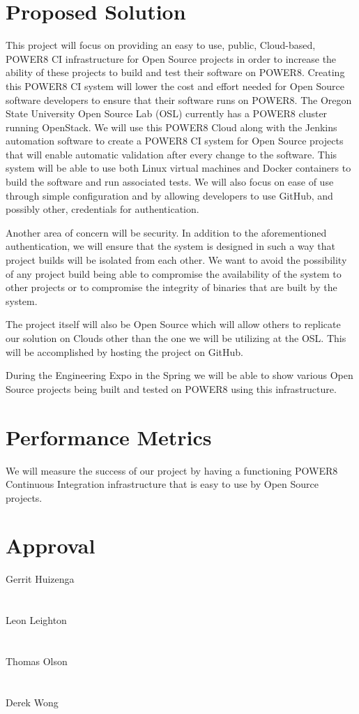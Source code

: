 \documentclass[10pt,letterpaper,onecolumn,draftclsnofoot]{IEEEtran}
\begin{document}
\section*{Proposed Solution}
This project will focus on providing an easy to use, public, Cloud-based, POWER8 CI infrastructure for Open Source projects in order to increase the ability of these projects to build and test their software on POWER8. 
Creating this POWER8 CI system will lower the cost and effort needed for Open Source software developers to ensure that their software runs on POWER8.
The Oregon State University Open Source Lab (OSL) currently has a POWER8 cluster running OpenStack.
We will use this POWER8 Cloud along with the Jenkins automation software to create a POWER8 CI system for Open Source projects that will enable automatic validation after every change to the software. 
This system will be able to use both Linux virtual machines and Docker containers to build the software and run associated tests. 
We will also focus on ease of use through simple configuration and by allowing developers to use GitHub, and possibly other, credentials for authentication.


Another area of concern will be security. In addition to the aforementioned authentication, we will ensure that the system is designed in such a way that project builds will be isolated from each other. We want to avoid the possibility of any project build being able to compromise the availability of the system to other projects or to compromise the integrity of binaries that are built by the system.


The project itself will also be Open Source which will allow others to replicate our solution on Clouds other than the one we will be utilizing at the OSL\@. 
This will be accomplished by hosting the project on GitHub. 

During the Engineering Expo in the Spring we will be able to show various Open Source projects being built and tested on POWER8 using this infrastructure.


\section*{Performance Metrics}
We will measure the success of our project by having a functioning POWER8 Continuous Integration infrastructure that is easy to use by Open Source projects. 

\clearpage
\section*{Approval}

\noindent Gerrit Huizenga\hspace{0.7cm} \makebox[1.5in]{\hrulefill}\\\\\\
Leon Leighton\hspace{0.85cm} \makebox[1.5in]{\hrulefill}\\\\\\
Thomas Olson\hspace{0.9cm} \makebox[1.5in]{\hrulefill}\\\\\\
Derek Wong\hspace{1.2cm} \makebox[1.5in]{\hrulefill}\\\\\\
\end{document}
